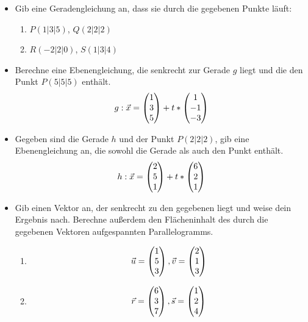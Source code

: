 \begin{itemize}
	\item Gib eine Geradengleichung an, dass sie durch die gegebenen Punkte läuft:
	\begin{enumerate}
		\item $P(1|3|5)$, $Q(2|2|2)$
		\item $R(-2|2|0)$, $S(1|3|4)$
	\end{enumerate}
	\item Berechne eine Ebenengleichung, die senkrecht zur Gerade $g$ liegt und die den Punkt $P(5|5|5)$ enthält.
	\begin{equation*}
		g:\vec x=\begin{pmatrix} 1\\3\\5 \end{pmatrix}+t*\begin{pmatrix} 1\\-1\\-3 \end{pmatrix}
	\end{equation*}
	\item Gegeben sind die Gerade $h$ und der Punkt $P(2|2|2)$, gib eine Ebenengleichung an, die sowohl die Gerade als auch den Punkt enthält.
	\begin{equation*}
		h:\vec x=\begin{pmatrix} 2\\5\\1 \end{pmatrix}+t*\begin{pmatrix} 6\\2\\1 \end{pmatrix}
	\end{equation*}
	\item Gib einen Vektor an, der senkrecht zu den gegebenen liegt und weise dein Ergebnis nach. Berechne außerdem den Flächeninhalt des durch die gegebenen Vektoren aufgespannten Parallelogramms.
	\begin{enumerate}
		\item %
		\begin{equation*}
			\vec u=\begin{pmatrix} 1\\5\\3 \end{pmatrix},\vec v=\begin{pmatrix} 2\\1\\3 \end{pmatrix}
		\end{equation*}
		\item %
		\begin{equation*}
			\vec r=\begin{pmatrix} 6\\3\\7 \end{pmatrix},\vec s=\begin{pmatrix} 1\\2\\4 \end{pmatrix}
		\end{equation*}
	\end{enumerate}

\end{itemize}
